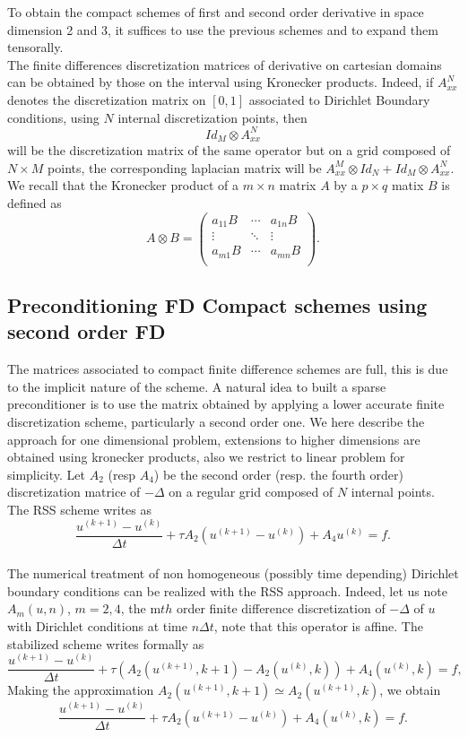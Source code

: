 \documentclass[11pt]{article}
\newcommand{\Frac}[2] {\frac{\textstyle #1} {\textstyle #2}}
\begin{document}
{To obtain the compact schemes of first and second order derivative in space dimension 2 and 3, it suffices to use 
the previous schemes and to expand them tensorally.\\
The finite differences discretization matrices of derivative on cartesian domains can be obtained by those on the interval using Kronecker products. Indeed, if $A^N_{xx}$ denotes the discretization matrix on $[0,1]$ associated to Dirichlet Boundary conditions, using $N$ internal discretization points, then 
$$
Id_M\otimes A^N_{xx}
$$
will be the discretization matrix of the same operator but on a grid composed of $N\times M$ points, the corresponding laplacian matrix will be $A^M_{xx}\otimes Id_N+Id_M\otimes A^N_{xx}$. We recall that the Kronecker product of a $m\times n$ matrix $A$ by a $p\times q$ matix $B$ is defined as
$$
A \otimes B= \begin{pmatrix}
a_{11} B&\cdots &  a_{1n} B \\ 
\vdots& \ddots&\vdots\\
 a_{m1} B&\cdots &  a_{mn} B \\ 
\end{pmatrix}. $$
\subsection{Preconditioning FD Compact schemes using second order FD}
The matrices associated to compact finite difference schemes are full, this is due to the implicit nature of the scheme.
A natural idea to built a sparse preconditioner is to use the matrix obtained by applying a lower accurate finite discretization scheme, particularly a second order one. We here describe the approach for one dimensional problem, extensions to higher dimensions are obtained using kronecker products, also we restrict to linear problem for simplicity. Let $A_2$ (resp $A_4$) be the second order (resp. the fourth order) discretization matrice  of $-\Delta$ on a regular grid composed of $N$ internal points. The RSS scheme writes as
\begin{equation}
\Frac{u^{(k+1)}-u^{(k)}}{\Delta t}+\tau A_2(u^{(k+1)}-u^{(k)})+A_4u^{(k)}=f.
\end{equation}
\\

The numerical treatment of non homogeneous (possibly time depending) Dirichlet boundary conditions can be realized with the RSS approach.  Indeed, let us note $A_m(u,n)$, $m=2,4$, the m$th$ order finite difference discretization of $-\Delta$ of $u$  with Dirichlet conditions at time $n\Delta t$, note that this operator is affine. The stabilized scheme writes  formally as
\begin{equation}
\Frac{u^{(k+1)}-u^{(k)}}{\Delta t}+\tau
(A_2(u^{(k+1)},k+1)-A_2(u^{(k)},k))+A_4(u^{(k)},k)=f,
\end{equation}
Making the approximation $A_2(u^{(k+1)},k+1)\simeq A_2(u^{(k+1)},k)$, we obtain
\begin{equation}
\Frac{u^{(k+1)}-u^{(k)}}{\Delta t}+\tau
A_2(u^{(k+1)}-u^{(k)})+A_4(u^{(k)},k)=f.
\end{equation}

}
\end{document}
